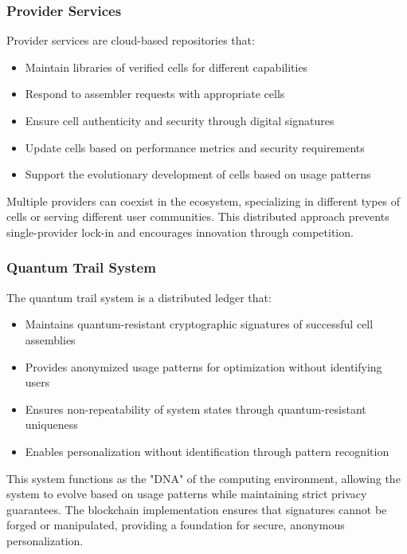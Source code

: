 \documentclass[11pt,a4paper]{article}
\begin{document}
\subsubsection{Provider Services}

Provider services are cloud-based repositories that:

\begin{itemize}
    \item Maintain libraries of verified cells for different capabilities
    \item Respond to assembler requests with appropriate cells
    \item Ensure cell authenticity and security through digital signatures
    \item Update cells based on performance metrics and security requirements
    \item Support the evolutionary development of cells based on usage patterns
\end{itemize}

Multiple providers can coexist in the ecosystem, specializing in different types of cells or serving different user communities. This distributed approach prevents single-provider lock-in and encourages innovation through competition.

\subsubsection{Quantum Trail System}

The quantum trail system is a distributed ledger that:

\begin{itemize}
    \item Maintains quantum-resistant cryptographic signatures of successful cell assemblies
    \item Provides anonymized usage patterns for optimization without identifying users
    \item Ensures non-repeatability of system states through quantum-resistant uniqueness
    \item Enables personalization without identification through pattern recognition
\end{itemize}

This system functions as the "DNA" of the computing environment, allowing the system to evolve based on usage patterns while maintaining strict privacy guarantees. The blockchain implementation ensures that signatures cannot be forged or manipulated, providing a foundation for secure, anonymous personalization.
\end{document}
